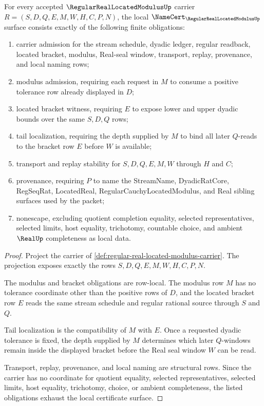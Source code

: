 \begin{theorem}
\label{thm:regular-real-located-modulus-namecert-obligations}
For every accepted $\RegularRealLocatedModulusUp$ carrier $R=(S,D,Q,E,M,W,H,C,P,N)$, the local $\NameCert_{\RegularRealLocatedModulusUp}$ surface consists exactly of the following finite obligations:
\begin{enumerate}
\item carrier admission for the stream schedule, dyadic ledger, regular readback, located bracket, modulus, Real-seal window, transport, replay, provenance, and local naming rows;
\item modulus admission, requiring each request in $M$ to consume a positive tolerance row already displayed in $D$;
\item located bracket witness, requiring $E$ to expose lower and upper dyadic bounds over the same $S,D,Q$ rows;
\item tail localization, requiring the depth supplied by $M$ to bind all later $Q$-reads to the bracket row $E$ before $W$ is available;
\item transport and replay stability for $S,D,Q,E,M,W$ through $H$ and $C$;
\item provenance, requiring $P$ to name the StreamName, DyadicRatCore, RegSeqRat, LocatedReal, RegularCauchyLocatedModulus, and Real sibling surfaces used by the packet;
\item nonescape, excluding quotient completion equality, selected representatives, selected limits, host equality, trichotomy, countable choice, and ambient $\RealUp$ completeness as local data.
\end{enumerate}
\end{theorem}
\begin{proof}
Project the carrier of \autoref{def:regular-real-located-modulus-carrier}. The projection exposes exactly the rows $S,D,Q,E,M,W,H,C,P,N$.

The modulus and bracket obligations are row-local. The modulus row $M$ has no tolerance coordinate other than the positive rows of $D$, and the located bracket row $E$ reads the same stream schedule and regular rational source through $S$ and $Q$.

Tail localization is the compatibility of $M$ with $E$. Once a requested dyadic tolerance is fixed, the depth supplied by $M$ determines which later $Q$-windows remain inside the displayed bracket before the Real seal window $W$ can be read.

Transport, replay, provenance, and local naming are structural rows. Since the carrier has no coordinate for quotient equality, selected representatives, selected limits, host equality, trichotomy, choice, or ambient completeness, the listed obligations exhaust the local certificate surface.
\end{proof}

